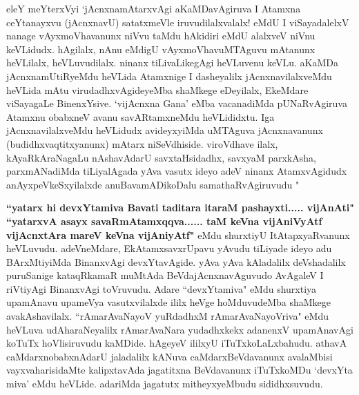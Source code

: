 
\centerline{}

\begin{artha}
eleY meYterxVyi `jAcnxnamAtarxvAgi aKaMDavAgiruva I Atamxna ceYtanayxvu 
(jAcnxnavU) satatxmeVle iruvudilalxvalalx! eMdU I viSayadalelxV nanage 
vAyxmoVhavanunx niVvu taMdu hAkidiri eMdU alalxveV niVnu keVLidudx. hAgilalx, 
nAnu eMdigU vAyxmoVhavuMTAguvu mAtanunx heVLilalx, heVLuvudilalx. ninanx 
tiLivaLikegAgi heVLuvenu keVLu. aKaMDa jAcnxnamUtiRyeMdu heVLida Atamxnige I 
dasheyalilx jAcnxnavilalxveMdu heVLida mAtu virudadhxvAgideyeMba shaMkege 
eDeyilalx, EkeMdare viSayagaLe BinenxYsive. `vijAcnxna Gana' eMba vacanadiMda 
pUNaRvAgiruva Atamxnu obabxneV avanu savARtamxneMdu heVLididxtu. Iga 
jAcnxnavilalxveMdu heVLidudx avideyxyiMda uMTAguva jAcnxnavanunx 
(budidhxvaqtitxyanunx) mAtarx niSeVdhiside. viroVdhave ilalx, kAyaRkAraNagaLu 
nAshavAdarU savxtaHsidadhx, savxyaM parxkAsha, parxmANadiMda tiLiyalAgada yAva 
vasutx ideyo adeV ninanx AtamxvAgidudx anAyxpeVkeSxyilalxde anuBavamADikoDalu 
samathaRvAgiruvudu "
\end{artha}

\begin{artha}
\textbf{``yatarx hi devxYtamiva Bavati taditara itaraM pashayxti..... vijAnAti"  ``yatarxvA asayx savaRmAtamxqqva...... taM keVna vijAniVyAtf vijAcnxtAra mareV keVna vijAniyAtf"} eMdu shurxtiyU ItAtapxyaRvanunx heVLuvudu. adeVneMdare, 
EkAtamxsavxrUpavu yAvudu tiLiyade ideyo adu BArxMtiyiMda BinanxvAgi  
devxYtavAgide. yAva yAva kAladalilx deVshadalilx puruSanige kataqRkamaR muMtAda 
BeVdajAcnxnavAguvudo AvAgaleV I riVtiyAgi BinanxvAgi toVruvudu. Adare 
``devxYtamiva" eMdu shurxtiya upamAnavu upameVya vasutxvilalxde ililx heVge 
hoMduvudeMba shaMkege avakAshavilalx. ``rAmarAvaNayoV yuRdadhxM rAmarAvaNayoVriva" eMdu heVLuva udAharaNeyalilx 
rAmarAvaNara yudadhxkekx adanenxV upamAnavAgi koTuTx hoVlisiruvudu kaMDide. 
hAgeyeV ililxyU iTuTxkoLaLxbahudu. athavA caMdarxnobabxnAdarU jaladalilx kANuva 
caMdarxBeVdavanunx avalaMbisi vayxvaharisidaMte kalipxtavAda jagatitxna 
BeVdavanunx iTuTxkoMDu `devxYta miva' eMdu heVLide. adariMda jagatutx 
mitheyxyeMbudu sididhxsuvudu. 
\end{artha}

